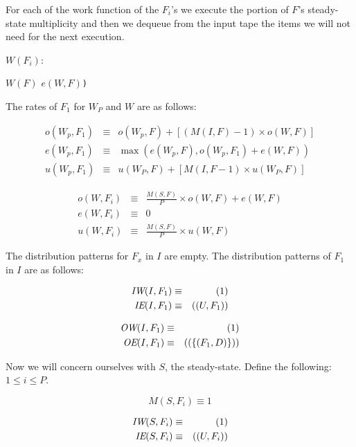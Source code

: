 For each of the work function of the $F_i$'s we execute the portion of
$F$'s steady-state multiplicity and then we dequeue from the input
tape the items we will not need for the next execution.  

\begin{algorithm}
$W(F_i)$:
\begin{algorithmic}[1]
\State $W(F)$
\EndFor
{}$e(W,F)${\tt)}
\end{algorithmic}
\end{algorithm}

The rates of $F_1$ for $W_P$ and $W$ are as follows:
 
\begin{eqnarray*} 
o(W_p,F_1) & \equiv & o(W_p,F) + [(M(I,F) - 1) \times o(W,F)] \\
e(W_p,F_1) & \equiv & \max(e(W_p,F), o(W_p,F_1) + e(W,F)) \\
u(W_p,F_1) & \equiv & u(W_P,F) + [M(I,F - 1) \times u(W_P,F)]
\end{eqnarray*} 

\begin{eqnarray*} 
o(W,F_i) & \equiv & \frac{M(S,F)}{P} \times o(W,F) + e(W,F)\\
e(W,F_i) & \equiv & 0 \\
u(W,F_i) & \equiv & \frac{M(S,F)}{P} \times u(W,F)
\end{eqnarray*} 

The distribution patterns for $F_x$ in $I$ are empty.  The
distribution patterns of $F_1$ in $I$ are as follows:

\begin{eqnarray*}
\mbox{\it IW}(I,F_1) & \equiv & (1) \\
\mbox{\it IE}(I,F_1) & \equiv & ((U,F_1)) 
\end{eqnarray*}

\begin{eqnarray*} 
\mbox{\it OW}(I,F_1) & \equiv & (1) \\
\mbox{\it OE}(I,F_1) & \equiv & ((\{(F_1, D)\})) 
\end{eqnarray*} 

Now we will concern ourselves with $S$, the steady-state.  Define the
following: $1 \le i \le P$.
 
$$ M(S,F_i) \equiv 1 $$

\begin{eqnarray*}
\mbox{\it IW}(S,F_i) & \equiv & (1) \\
\mbox{\it IE}(S,F_i) & \equiv & ((U,F_i)) 
\end{eqnarray*}

